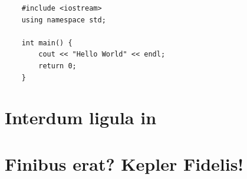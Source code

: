 \documentclass[8pt]{article}
\begin{document}
\vspace{10pt}
\begin{lstlisting}
    #include <iostream>
    using namespace std;

    int main() {
    	cout << "Hello World" << endl;
    	return 0;
    }
\end{lstlisting}
\vspace{5pt}









%
%
%

\newpage
\section{Interdum ligula in}


















%
%
%

\newpage
\section{Finibus erat? Kepler Fidelis!}










%
%
%
\end{document}
